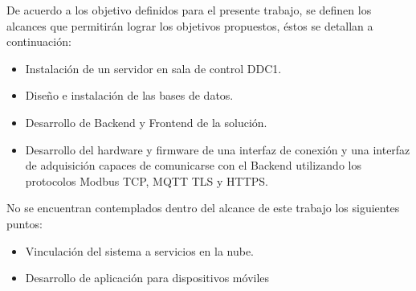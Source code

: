 De acuerdo a los objetivo definidos para el presente trabajo, se definen los alcances que permitirán lograr los objetivos propuestos, éstos se detallan a continuación:

\begin{itemize}
 
	\item Instalación de un servidor en sala de control DDC1.
	\item Diseño e instalación de las bases de datos.
	\item Desarrollo de Backend y Frontend de la solución.
	\item Desarrollo del hardware y firmware de una interfaz de conexión y una interfaz de adquisición capaces de comunicarse con el Backend utilizando los protocolos Modbus TCP, MQTT TLS y HTTPS.
	
\end{itemize}

No se encuentran contemplados dentro del alcance de este trabajo los siguientes puntos:
\begin{itemize}
	\item Vinculación del sistema a servicios en la nube.
	\item Desarrollo de aplicación para dispositivos móviles
\end{itemize}


